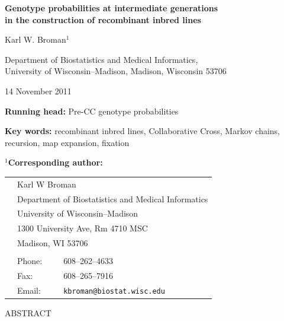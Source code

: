 \documentclass[12pt,letterpaper]{article}
\begin{document}

\vspace*{8mm}
\begin{center}

\textbf{\Large Genotype probabilities at intermediate generations\\[18pt]
in the construction of recombinant inbred lines}
 
 
\bigskip \bigskip \bigskip \bigskip 
 
{\large Karl W. Broman$^1$

\bigskip \bigskip

Department of Biostatistics and Medical Informatics, \\
University of Wisconsin--Madison, Madison, Wisconsin 53706 }
\end{center}


\vfill

\hfill 
{\footnotesize 14 November 2011}

\newpage

\noindent \textbf{Running head:} 
Pre-CC genotype probabilities


\bigskip \bigskip \bigskip

\noindent \textbf{Key words:} recombinant inbred lines, Collaborative
Cross, Markov chains, recursion, map expansion, fixation




\bigskip \bigskip \bigskip

\noindent \textbf{$^1$Corresponding author:}

\begin{tabular}{lll}
 \\
 \hspace{1cm} & \multicolumn{2}{l}{Karl W Broman} \\
 & \multicolumn{2}{l}{Department of Biostatistics and Medical Informatics} \\
 & \multicolumn{2}{l}{University of Wisconsin--Madison} \\
 & \multicolumn{2}{l}{1300 University Ave, Rm 4710 MSC} \\
 & \multicolumn{2}{l}{Madison, WI 53706} \\
 \\
 & Phone: & 608--262--4633 \\
 & Fax: & 608--265--7916 \\
 & Email: & \verb|kbroman@biostat.wisc.edu|
\end{tabular}


\clearpage
\centerline{ABSTRACT} 
  
\end{document}
